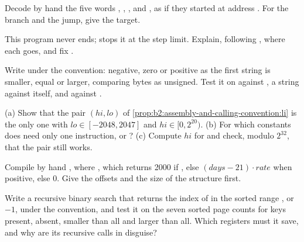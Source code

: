 \begin{exercise}[$\star\star$]\label{exo:b2:assembly-and-calling-convention:5}
Decode by hand the five words , , ,  and
, as if they started at address . For the branch and the jump, give the target.
\end{exercise}

\begin{exercise}[$\star\star$]\label{exo:b2:assembly-and-calling-convention:6}
This program never ends;  stops it at the step limit. Explain, following , where each 
goes, and fix .
\end{exercise}

\begin{exercise}[$\star\star$]\label{exo:b2:assembly-and-calling-convention:7}
Write  under the convention: negative, zero or positive as the first string is smaller, equal or
larger, comparing bytes as unsigned. Test it on  against , a string against itself,
and  against .
\end{exercise}

\begin{exercise}[$\star\star$]\label{exo:b2:assembly-and-calling-convention:8}
(a) Show that the pair $(\mathit{hi}, \mathit{lo})$ of \cref{prop:b2:assembly-and-calling-convention:li} is the only
one with $\mathit{lo} \in [-2048, 2047]$ and $\mathit{hi} \in [0, 2^{20})$. (b) For which constants does 
need only one instruction,  or ? (c) Compute $\mathit{hi}$ for  and check,
modulo $2^{32}$, that the pair still works.
\end{exercise}

\begin{exercise}[$\star\star$]\label{exo:b2:assembly-and-calling-convention:9}
Compile by hand , where ,
which returns 2000 if , else $(\mathit{days} - 21) \cdot \mathit{rate}$ when positive, else 0. Give the
offsets and the size of the structure first.
\end{exercise}

\begin{exercise}[$\star\star\star$]\label{exo:b2:assembly-and-calling-convention:10}
Write a recursive binary search  that returns the index of
 in the sorted range \code{a[lo..hi)}, or $-1$, under the convention, and test it on the seven sorted page
counts for keys present, absent, smaller than all and larger than all. Which registers must it save, and why are its
recursive calls  in disguise?
\end{exercise}


